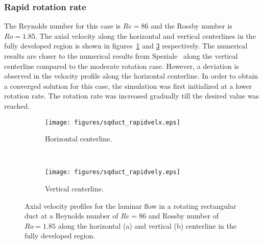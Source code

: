 \subsubsection{Rapid rotation rate}
The Reynolds number for this case is $Re=86$ and the Rossby number is $Ro=1.85$. The axial velocity along the horizontal and vertical centerlines in the fully developed region is shown in figures~\ref{fig:sqductrapx} and \ref{fig:sqductrapy} respectively. The numerical results are closer to the numerical results from Speziale~\cite{Speziale1982} along the vertical centerline compared to the moderate rotation case. However, a deviation is observed in the velocity profile along the horizontal centerline. In order to obtain a converged solution for this case, the simulation was first initialized at a lower rotation rate. The rotation rate was increased gradually till the desired value was reached.
\begin{figure}[h!]
    \centering
    \captionsetup{justification=centering}
    \begin{subfigure}[b]{0.48\textwidth}
    \captionsetup{justification=centering}
        \texttt{[image: figures/sqduct\_rapidvelx.eps]}    
    \caption{Horizontal centerline.}
    \label{fig:sqductrapx}
    \end{subfigure}
    ~ %
    \begin{subfigure}[b]{0.48\textwidth}
    \centering
    \captionsetup{justification=centering}
        \texttt{[image: figures/sqduct\_rapidvely.eps]}
        \caption{Vertical centerline.}
    \label{fig:sqductrapy}
    \end{subfigure}
    \caption{Axial velocity profiles for the laminar flow in a rotating rectangular duct at a Reynolds number of $Re=86$ and Rossby number of $Ro=1.85$ along the horizontal (a) and vertical (b) centerline in the fully developed region.}
\end{figure}

